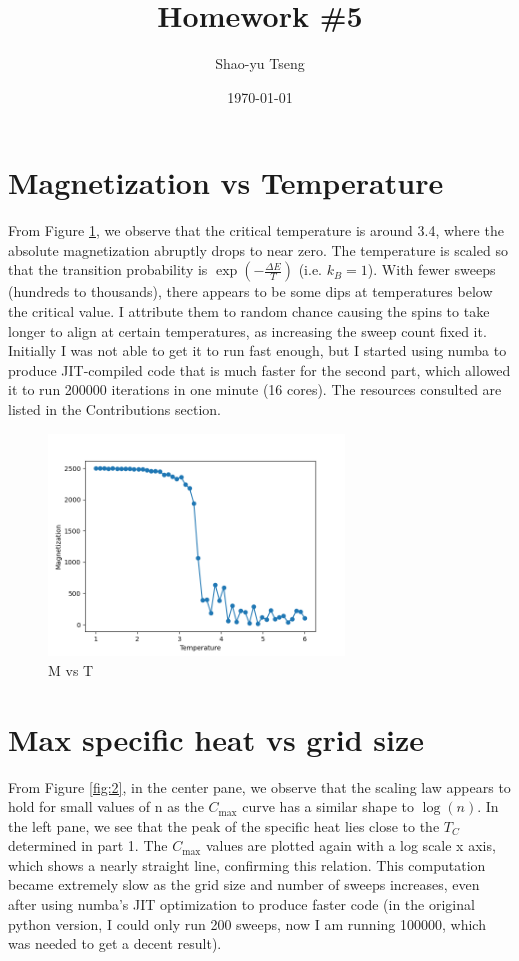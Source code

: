 \documentclass[11pt]{article}
\author{Shao-yu Tseng}
\date{\today}
\title{Homework \#5}
\begin{document}
\maketitle

\section{Magnetization vs Temperature}

From Figure \ref{fig:1}, we observe that the critical temperature is around 3.4, where the absolute magnetization abruptly drops to near zero. The temperature is scaled so that the transition probability is \(\exp(-\frac{\Delta E}{T})\) (i.e. \(k_B = 1\)). With fewer sweeps (hundreds to thousands), there appears to be some dips at temperatures below the critical value. I attribute them to random chance causing the spins to take longer to align at certain temperatures, as increasing the sweep count fixed it. Initially I was not able to get it to run fast enough, but I started using numba to produce JIT-compiled code that is much faster for the second part, which allowed it to run 200000 iterations in one minute (16 cores). The resources consulted are listed in the Contributions section.

\begin{figure}[htbp]
\label{fig:1}
\centerline{\includegraphics[width=0.7\textwidth]{ising-part1.png}}
\caption[]{M vs T}
\end{figure}
\pagebreak
\section{Max specific heat vs grid size}

From Figure \ref{fig:2}, in the center pane, we observe that the scaling law appears to hold for small values of n as the \(C_{\text{max}}\) curve has a similar shape to \(\log(n)\). In the left pane, we see that the peak of the specific heat lies close to the \(T_{C}\) determined in part 1. The \(C_{\text{max}}\) values are plotted again with a log scale x axis, which shows a nearly straight line, confirming this relation. This computation became extremely slow as the grid size and number of sweeps increases, even after using numba's JIT optimization to produce faster code (in the original python version, I could only run 200 sweeps, now I am running 100000, which was needed to get a decent result).
\end{document}
